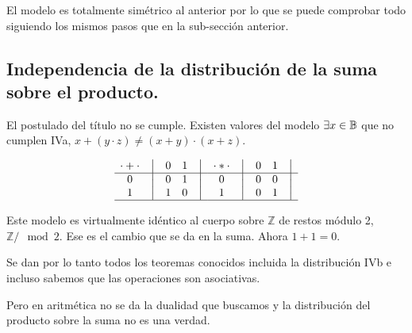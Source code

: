 \documentclass[12pt,a4paper]{article}
\newcommand{\setZ}{\ensuremath{\mathbb{Z}}}
\begin{document}
	El modelo es totalmente simétrico al anterior por lo que se puede
comprobar todo siguiendo los mismos pasos que en la sub-sección anterior.



\subsection{Independencia de la distribución de la suma sobre el producto.}



	El postulado del título no se cumple. Existen valores del modelo \(
\exists x \in \mathbb{B} \) que no cumplen IVa, \( x + ( y \cdot z )
\neq ( x + y ) \cdot (x + z) \).



\begin{equation}
    \begin{matrix}
        {\cdot + \cdot} & \big{\vert} & {0} & {1} & \big{\vert} \\
        \hline
        {0}             & \big{\vert} & {0} & {1} & \big{\vert} \\
        {1}             & \big{\vert} & {1} & {0} & \big{\vert} \\
        \hline
    \end{matrix}
    \quad
    \begin{matrix}
        {\cdot * \cdot} & \big{\vert} & {0} & {1} & \big{\vert} \\
        \hline
        {0}                   & \big{\vert} & {0} & {0} & \big{\vert} \\
        {1}                   & \big{\vert} & {0} & {1} & \big{\vert} \\
        \hline
    \end{matrix}
\end{equation}



	Este modelo es virtualmente idéntico al cuerpo sobre \(\setZ\) de restos
módulo 2, \(\setZ/{\mod2}\). Ese es el cambio que se da en la suma. Ahora \(1
+ 1 = 0\).



	Se dan por lo tanto todos los teoremas conocidos incluida la distribución
IVb e incluso sabemos que las operaciones son asociativas.



	Pero en aritmética no se da la dualidad que buscamos y la distribución
del producto sobre la suma no es una verdad.
\end{document}
